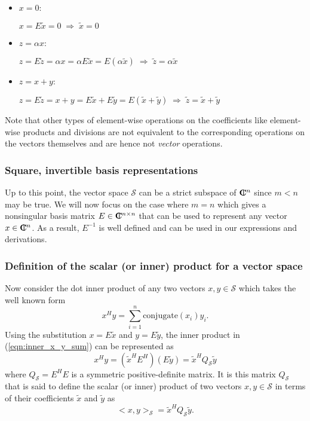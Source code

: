 \begin{itemize}

{}\item $x = 0$:

$x = E \tilde{x} = 0 \; \Rightarrow \; \tilde{x} = 0$ 

{}\item $z = \alpha x$:

$z = E \tilde{z} = \alpha x = \alpha E \tilde{x} = E ( \alpha
\tilde{x} ) \; \Rightarrow \; \tilde{z} = \alpha \tilde{x}$

{}\item $z = x + y$:

$z = E \tilde{z} = x + y = E \tilde{x} + E \tilde{y} = E ( \tilde{x} +
\tilde{y} ) \; \Rightarrow \; \tilde{z} = \tilde{x} + \tilde{y}$

\end{itemize}

Note that other types of element-wise operations on the coefficients like
element-wise products and divisions are not equivalent to the corresponding
operations on the vectors themselves and are hence not {}\textit{vector}
operations.

\subsubsection{Square, invertible basis representations}

Up to this point, the vector space $\mathcal{S}$ can be a strict subspace of
$\mbox{\textbf{C}}\hspace{-1.1ex}\mbox{l}\hspace{0.4ex}^n$ since $m < n$ may be true.  We will now focus on the case where $m =
n$ which gives a nonsingular basis matrix $E\in\mbox{\textbf{C}}\hspace{-1.1ex}\mbox{l}\hspace{0.4ex}^{n\times{}n}$ that can be
used to represent any vector $x\in\mbox{\textbf{C}}\hspace{-1.1ex}\mbox{l}\hspace{0.4ex}^n$.  As a result, $E^{-1}$ is well
defined and can be used in our expressions and derivations.

\subsubsection{Definition of the scalar (or inner) product for a vector space}

Now consider the dot inner product of any two vectors $x,y\in\mathcal{S}$
which takes the well known form
%
\begin{equation}
x^H y = \sum_{i=1}^n \mbox{conjugate}(x_i) y_i.
\label{eqn:inner_x_y_sum}
\end{equation}
%
Using the substitution $x = E {}\tilde{x}$ and $y = E {}\tilde{y}$, the inner
product in (\ref{eqn:inner_x_y_sum}) can be represented as
%
\begin{equation}
x^H y = ( \tilde{x}^H E^H ) ( E \tilde{y} ) = \tilde{x}^H Q_{\mathcal{S}} \tilde{y}
\label{eqn:inner_x_y_E_prod}
\end{equation}
%
where $Q_{\mathcal{S}} = E^H E$ is a symmetric positive-definite matrix.  It
is this matrix $Q_{\mathcal{S}}$ that is said to define the scalar (or inner)
product of two vectors $x,y\in\mathcal{S}$ in terms of their coefficients
$\tilde{x}$ and $\tilde{y}$ as
%
\begin{equation}
<x,y>_{\mathcal{S}} = \tilde{x}^H Q_{\mathcal{S}} \tilde{y}.
\label{eqn:inner_prod_defined}
\end{equation}
%

